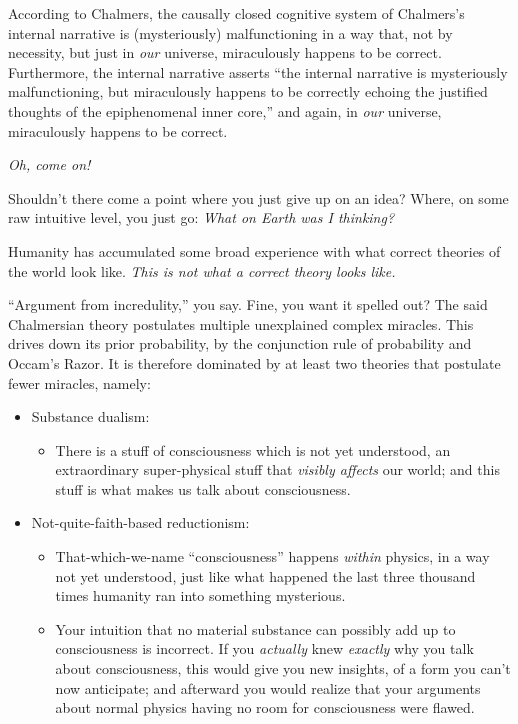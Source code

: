 {
 According to Chalmers, the causally closed cognitive system of
Chalmers's internal narrative is (mysteriously)
malfunctioning in a way that, not by necessity, but just in
\textit{our} universe, miraculously happens to be correct. Furthermore,
the internal narrative asserts ``the internal
narrative is mysteriously malfunctioning, but miraculously happens to
be correctly echoing the justified thoughts of the epiphenomenal inner
core,'' and again, in \textit{our} universe,
miraculously happens to be correct.}

{
 \textit{Oh, come on!}}

{
 Shouldn't there come a point where you just give
up on an idea? Where, on some raw intuitive level, you just go:
\textit{What on Earth was I thinking?}}

{
 Humanity has accumulated some broad experience with what correct
theories of the world look like. \textit{This is not what a correct
theory looks like.}}

{
 ``Argument from incredulity,''
you say. Fine, you want it spelled out? The said Chalmersian theory
postulates multiple unexplained complex miracles. This drives down its
prior probability, by the conjunction rule of probability and
Occam's Razor. It is therefore dominated by at least
two theories that postulate fewer miracles, namely:}

\begin{itemize}
\item
{
  Substance dualism:
    \begin{itemize}
    \item
There is a stuff of consciousness which is not
yet understood, an extraordinary super-physical stuff that
\textit{visibly affects} our world; and this stuff is what makes us
talk about consciousness.
\end{itemize}
}

\item
{
  Not-quite-faith-based reductionism:
  \begin{itemize}
    \item
  That-which-we-name
``consciousness'' happens
\textit{within} physics, in a way not yet understood, just like what
happened the last three thousand times humanity ran into something
mysterious.
\item
Your intuition that no material substance can possibly add
up to consciousness is incorrect. If you \textit{actually} knew
\textit{exactly} why you talk about consciousness, this would give you
new insights, of a form you can't now anticipate; and
afterward you would realize that your arguments about normal physics
having no room for consciousness were flawed.
\end{itemize}
}

\end{itemize}


